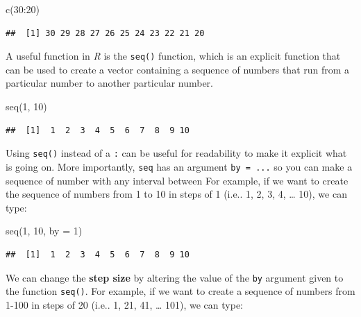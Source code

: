 \documentclass[
]{book}
\newenvironment{Shaded}{\begin{snugshade}}{\end{snugshade}}
\newcommand{\AttributeTok}[1]{\textcolor[rgb]{0.77,0.63,0.00}{#1}}
\newcommand{\DecValTok}[1]{\textcolor[rgb]{0.00,0.00,0.81}{#1}}
\newcommand{\FunctionTok}[1]{\textcolor[rgb]{0.00,0.00,0.00}{#1}}
\newcommand{\NormalTok}[1]{#1}
\newcommand{\SpecialCharTok}[1]{\textcolor[rgb]{0.00,0.00,0.00}{#1}}
\begin{document}
\begin{Shaded}
\begin{Highlighting}[]
\FunctionTok{c}\NormalTok{(}\DecValTok{30}\SpecialCharTok{:}\DecValTok{20}\NormalTok{)}
\end{Highlighting}
\end{Shaded}

\begin{verbatim}
##  [1] 30 29 28 27 26 25 24 23 22 21 20
\end{verbatim}

A useful function in \emph{R} is the \texttt{seq()} function, which is an explicit function that can be used to create a vector containing a sequence of numbers that run from a particular number to another particular number.

\begin{Shaded}
\begin{Highlighting}[]
\FunctionTok{seq}\NormalTok{(}\DecValTok{1}\NormalTok{, }\DecValTok{10}\NormalTok{)}
\end{Highlighting}
\end{Shaded}

\begin{verbatim}
##  [1]  1  2  3  4  5  6  7  8  9 10
\end{verbatim}

Using \texttt{seq()} instead of a \texttt{:} can be useful for readability to make it explicit what is going on. More importantly, \texttt{seq} has an argument \texttt{by\ =\ ...} so you can make a sequence of number with any interval between For example, if we want to create the sequence of numbers from 1 to 10 in steps of 1 (i.e.. 1, 2, 3, 4, \ldots{} 10), we can type:

\begin{Shaded}
\begin{Highlighting}[]
\FunctionTok{seq}\NormalTok{(}\DecValTok{1}\NormalTok{, }\DecValTok{10}\NormalTok{,}
    \AttributeTok{by =} \DecValTok{1}\NormalTok{)}
\end{Highlighting}
\end{Shaded}

\begin{verbatim}
##  [1]  1  2  3  4  5  6  7  8  9 10
\end{verbatim}

We can change the \textbf{step size} by altering the value of the \texttt{by} argument given to the function \texttt{seq()}. For example, if we want to create a sequence of numbers from 1-100 in steps of 20 (i.e.. 1, 21, 41, \ldots{} 101), we can type:
\end{document}
